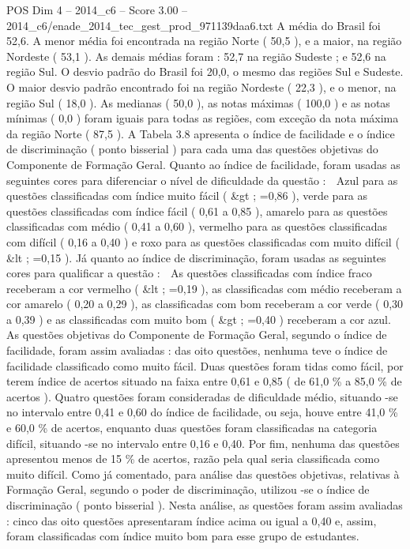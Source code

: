 \begin{textsample}{POS Dim 4 – 2014\_c6 – Score 3.00 – 2014\_c6/enade\_2014\_tec\_gest\_prod\_971139daa6.txt}
A média do Brasil foi 52,6.
A menor média foi encontrada na região Norte ( 50,5 ), e a maior, na região Nordeste ( 53,1 ).
As demais médias foram : 52,7 na região Sudeste ; e 52,6 na região Sul.
O desvio padrão do Brasil foi 20,0, o mesmo das regiões Sul e Sudeste.
O maior desvio padrão encontrado foi na região Nordeste ( 22,3 ), e o menor, na região Sul ( 18,0 ).
As medianas ( 50,0 ), as notas máximas ( 100,0 ) e as notas mínimas ( 0,0 ) foram iguais para todas as regiões, com exceção da nota máxima da região Norte ( 87,5 ).
A Tabela 3.8 apresenta o índice de facilidade e o índice de discriminação ( ponto bisserial ) para cada uma das questões objetivas do Componente de Formação Geral.
Quanto ao índice de facilidade, foram usadas as seguintes cores para diferenciar o nível de dificuldade da questão :  Azul para as questões classificadas com índice muito fácil ( \&gt ; =0,86 ), verde para as questões classificadas com índice fácil ( 0,61 a 0,85 ), amarelo para as questões classificadas com médio ( 0,41 a 0,60 ), vermelho para as questões classificadas com difícil ( 0,16 a 0,40 ) e roxo para as questões classificadas com muito difícil ( \&lt ; =0,15 ).
Já quanto ao índice de discriminação, foram usadas as seguintes cores para qualificar a questão :  As questões classificadas com índice fraco receberam a cor vermelho ( \&lt ; =0,19 ), as classificadas com médio receberam a cor amarelo ( 0,20 a 0,29 ), as classificadas com bom receberam a cor verde ( 0,30 a 0,39 ) e as classificadas com muito bom ( \&gt ; =0,40 ) receberam a cor azul.
As questões objetivas do Componente de Formação Geral, segundo o índice de facilidade, foram assim avaliadas : das oito questões, nenhuma teve o índice de facilidade classificado como muito fácil.
Duas questões foram tidas como fácil, por terem índice de acertos situado na faixa entre 0,61 e 0,85 ( de 61,0 \% a 85,0 \% de acertos ).
Quatro questões foram consideradas de dificuldade médio, situando -se no intervalo entre 0,41 e 0,60 do índice de facilidade, ou seja, houve entre 41,0 \% e 60,0 \% de acertos, enquanto duas questões foram classificadas na categoria difícil, situando -se no intervalo entre 0,16 e 0,40.
Por fim, nenhuma das questões apresentou menos de 15 \% de acertos, razão pela qual seria classificada como muito difícil.
Como já comentado, para análise das questões objetivas, relativas à Formação Geral, segundo o poder de discriminação, utilizou -se o índice de discriminação ( ponto bisserial ).
Nesta análise, as questões foram assim avaliadas : cinco das oito questões apresentaram índice acima ou igual a 0,40 e, assim, foram classificadas com índice muito bom para esse grupo de estudantes.

\end{textsample}
